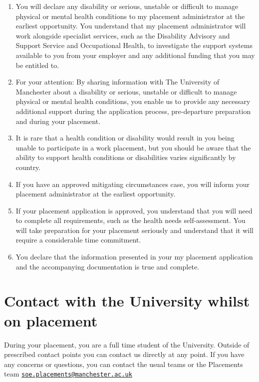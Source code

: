 \documentclass[
]{book}
\providecommand{\tightlist}{%
  \setlength{\itemsep}{0pt}\setlength{\parskip}{0pt}}
\begin{document}
\begin{enumerate}
\def\labelenumi{\arabic{enumi}.}
\tightlist
\item
  You will declare any disability or serious, unstable or difficult to manage physical or mental health conditions to my placement administrator at the earliest opportunity. You understand that my placement administrator will work alongside specialist services, such as the Disability Advisory and Support Service and Occupational Health, to investigate the support systems available to you from your employer and any additional funding that you may be entitled to.
\item
  For your attention: By sharing information with The University of Manchester about a disability or serious, unstable or difficult to manage physical or mental health conditions, you enable us to provide any necessary additional support during the application process, pre-departure preparation and during your placement.
\item
  It is rare that a health condition or disability would result in you being unable to participate in a work placement, but you should be aware that the ability to support health conditions or disabilities varies significantly by country.
\item
  If you have an approved mitigating circumstances case, you will inform your placement administrator at the earliest opportunity.
\item
  If your placement application is approved, you understand that you will need to complete all requirements, such as the health needs self-assessment. You will take preparation for your placement seriously and understand that it
  will require a considerable time commitment.
\item
  You declare that the information presented in your my placement application and the accompanying documentation is true and complete.
\end{enumerate}

\section{Contact with the University whilst on placement}\label{contact-with-the-university-whilst-on-placement}

During your placement, you are a full time student of the University. Outside of prescribed contact points you can contact us directly at any point. If you have any concerns or questions, you can contact the usual teams or the Placements team \href{mailto:soe.placements@manchester.ac.uk}{\nolinkurl{soe.placements@manchester.ac.uk}}
\end{document}

